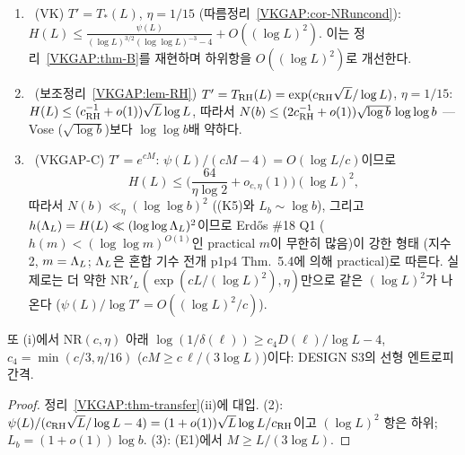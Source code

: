 \begin{corollary}[세 가지 구체화]\label{VKGAP:cor-three}
\begin{enumerate}[label=(\arabic*)]
\item {}\ (VK) $T'=T_*(L)$, $\eta=1/15$ (따름정리~\ref{VKGAP:cor-NRuncond}):
$H(L)\le\frac{\psi(L)}{(\log L)^{3/2}(\log\log L)^{-3}-4}+O((\log L)^2)$. 이는 정리~\ref{VKGAP:thm-B}를 재현하며 하위항을 $O((\log L)^2)$로 개선한다.
\item {}\ (보조정리~\ref{VKGAP:lem-RH}) $T'=T_{\rm RH}(L)=\exp(c_{\rm RH}\sqrt L/\log L)$, $\eta=1/15$:
$H(L)\le(c_{\rm RH}^{-1}+o(1))\sqrt L\log L$, 따라서 $N(b)\le(2c_{\rm RH}^{-1}+o(1))\sqrt{\log b}\,\log\log b$ --- Vose ($\sqrt{\log b}$)보다 $\log\log b$배 약하다.
\item {}\ (VKGAP-C) $T'=e^{cM}$: $\psi(L)/(cM-4)=O(\log L/c)$이므로
\[
H(L)\le\Big(\frac{64}{\eta\log2}+o_{c,\eta}(1)\Big)(\log L)^2,
\]
따라서 $N(b)\ll_\eta(\log\log b)^2$ ((K5)와 $L_b\sim\log b$), 그리고 $h(\Lambda_L)=H(L)\ll(\log\log\Lambda_L)^2$이므로
Erdős \#18 Q1 ($h(m)<(\log\log m)^{O(1)}$인 practical $m$이 무한히 많음)이 강한 형태 (지수 2, $m=\Lambda_L$; $\Lambda_L$은 혼합 기수 전개 p1p4 Thm.~5.4에 의해 practical)로 따른다.
실제로는 더 약한 $\mathrm{NR}'_L(\exp(cL/(\log L)^2),\eta)$만으로 같은 $(\log L)^2$가 나온다 ($\psi(L)/\log T'=O((\log L)^2/c)$).
\end{enumerate}
또 (i)에서 $\mathrm{NR}(c,\eta)$ 아래 $\log(1/\delta(\ell))\ge c_4D(\ell)/\log L-4$, $c_4=\min(c/3,\eta/16)$ ($cM\ge c\,\ell/(3\log L)$)이다: DESIGN S3의 선형 엔트로피 간격.
\end{corollary}
\begin{proof}
정리~\ref{VKGAP:thm-transfer}(ii)에 대입. (2): $\psi(L)/(c_{\rm RH}\sqrt L/\log L-4)=(1+o(1))\sqrt L\log L/c_{\rm RH}$이고 $(\log L)^2$ 항은 하위;
$L_b=(1+o(1))\log b$. (3): (E1)에서 $M\ge L/(3\log L)$.
\end{proof}

